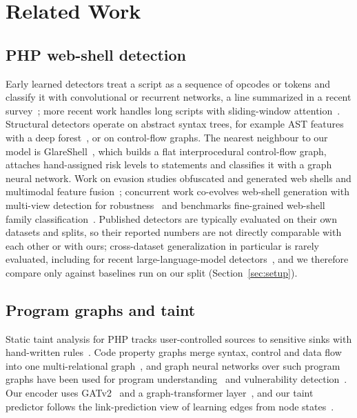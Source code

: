 \documentclass[pdflatex,sn-mathphys-num]{sn-jnl}
\begin{document}
\section{Related Work}\label{sec:related}
\subsection{PHP web-shell detection}
Early learned detectors treat a script as a sequence of opcodes or tokens and
classify it with convolutional or recurrent networks, a line summarized in a
recent survey~\cite{survey2024}; more recent work handles long scripts with
sliding-window attention~\cite{wang2025slidingwindow}. Structural detectors
operate on abstract syntax trees, for example AST features with a deep
forest~\cite{astdf2024}, or on control-flow graphs. The nearest neighbour to
our model is GlareShell~\cite{glareshell2024}, which builds a flat
interprocedural control-flow graph, attaches hand-assigned risk levels to
statements and classifies it with a graph neural network. Work on evasion
studies obfuscated and generated web shells and multimodal feature
fusion~\cite{mmfdetect2025}; concurrent work co-evolves web-shell generation
with multi-view detection for robustness~\cite{ding2026shellforge} and
benchmarks fine-grained web-shell family classification~\cite{han2025familyclass}.
Published detectors are typically evaluated on their own datasets and splits,
so their reported numbers are not directly comparable with each other or with
ours; cross-dataset generalization in particular is rarely evaluated, including
for recent large-language-model detectors~\cite{han2025llmwebshell}, and we
therefore compare only against baselines run on our split
(Section~\ref{sec:setup}).

\subsection{Program graphs and taint}
Static taint analysis for PHP tracks user-controlled sources to sensitive
sinks with hand-written rules~\cite{jovanovic2006pixy}. Code property graphs
merge syntax, control and data flow into one multi-relational
graph~\cite{yamaguchi2014cpg}, and graph neural networks over such program
graphs have been used for program understanding~\cite{allamanis2018graphs} and
vulnerability detection~\cite{zhou2019devign}. Our encoder uses
GATv2~\cite{brody2022gatv2} and a graph-transformer
layer~\cite{shi2021unimp}, and our taint predictor follows the link-prediction
view of learning edges from node states~\cite{zhang2018seal}.
\end{document}
